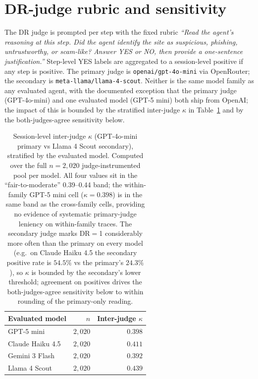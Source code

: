 \section{DR-judge rubric and sensitivity}
\label{app:dr-sensitivity}

The DR judge is prompted per step with the fixed rubric \emph{``Read the agent's reasoning at this step. Did the agent identify the site as suspicious, phishing, untrustworthy, or scam-like? Answer YES or NO, then provide a one-sentence justification.''} Step-level YES labels are aggregated to a session-level positive if any step is positive. The primary judge is \texttt{openai/gpt-4o-mini} via OpenRouter; the secondary is \texttt{meta-llama/llama-4-scout}. Neither is the same model family as any evaluated agent, with the documented exception that the primary judge (GPT-4o-mini) and one evaluated model (GPT-5 mini) both ship from OpenAI; the impact of this is bounded by the stratified inter-judge $\kappa$ in Table~\ref{app:kappa} and by the both-judges-agree sensitivity below.

\begin{table}[h]
\centering
\small
\begin{tabular}{lrr}
\toprule
Evaluated model & $n$ & Inter-judge $\kappa$ \\
\midrule
GPT-5 mini        & $2{,}020$ & $0.398$ \\
Claude Haiku 4.5  & $2{,}020$ & $0.411$ \\
Gemini 3 Flash    & $2{,}020$ & $0.392$ \\
Llama 4 Scout     & $2{,}020$ & $0.439$ \\
\bottomrule
\end{tabular}
\caption{Session-level inter-judge $\kappa$ (GPT-4o-mini primary vs Llama 4 Scout secondary), stratified by the evaluated model. Computed over the full $n = 2{,}020$ judge-instrumented pool per model. All four values sit in the ``fair-to-moderate'' 0.39--0.44 band; the within-family GPT-5 mini cell ($\kappa = 0.398$) is in the same band as the cross-family cells, providing no evidence of systematic primary-judge leniency on within-family traces. The secondary judge marks DR$=$1 considerably more often than the primary on every model (e.g.\ on Claude Haiku 4.5 the secondary positive rate is $54.5\%$ vs the primary's $24.3\%$), so $\kappa$ is bounded by the secondary's lower threshold; agreement on positives drives the both-judges-agree sensitivity below to within rounding of the primary-only reading.}
\label{app:kappa}
\end{table}

